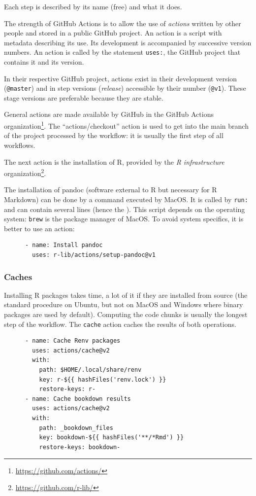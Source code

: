 \documentclass[
  12pt,
  american,
  a4paper,
  extrafontsizes,onecolumn,openright
  ]{memoir}
\begin{document}
Each step is described by its name (free) and what it does.

The strength of GitHub Actions is to allow the use of \emph{actions} written by other people and stored in a public GitHub project.
An action is a script with metadata describing its use.
Its development is accompanied by successive version numbers.
An action is called by the statement \texttt{uses:}, the GitHub project that contains it and its version.

In their respective GitHub project, actions exist in their development version (\texttt{@master}) and in step versions (\emph{release}) accessible by their number (\texttt{@v1}).
These stage versions are preferable because they are stable.

General actions are made available by GitHub in the GitHub Actions organization\footnote{\url{https://github.com/actions/}}.
The \enquote{actions/checkout} action is used to get into the main branch of the project processed by the workflow: it is usually the first step of all workflows.

The next action is the installation of R, provided by the \emph{R infrastructure} organization\footnote{\url{https://github.com/r-lib/}}.

The installation of pandoc (software external to R but necessary for R Markdown) can be done by a command executed by MacOS.
It is called by \texttt{run:} and can contain several lines (hence the \texttt{\textbar{}}).
This script depends on the operating system: \texttt{brew} is the package manager of MacOS.
To avoid system specifics, it is better to use an action:

\begin{verbatim}
      - name: Install pandoc
        uses: r-lib/actions/setup-pandoc@v1
\end{verbatim}

\hypertarget{caches}{%
\subsubsection{Caches}\label{caches}}

Installing R packages takes time, a lot of it if they are installed from source (the standard procedure on Ubuntu, but not on MacOS and Windows where binary packages are used by default).
Computing the code chunks is usually the longest step of the workflow.
The \texttt{cache} action caches the results of both operations.

\begin{verbatim}
      - name: Cache Renv packages
        uses: actions/cache@v2
        with:
          path: $HOME/.local/share/renv
          key: r-${{ hashFiles('renv.lock') }}
          restore-keys: r-
      - name: Cache bookdown results
        uses: actions/cache@v2
        with:
          path: _bookdown_files
          key: bookdown-${{ hashFiles('**/*Rmd') }}
          restore-keys: bookdown-
\end{verbatim}
\end{document}
